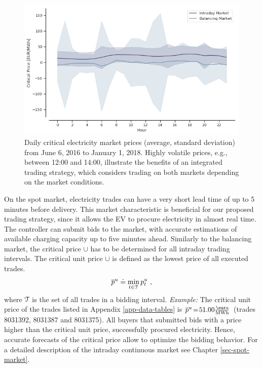 \documentclass[a4paper, 12pt]{article}
\begin{document}
\begin{figure}[hp]
\centering
\includegraphics[width=1\linewidth]{fig/critical-prices.png}
\caption[Critical electricity prices]{Daily critical electricity market prices (average, standard deviation) from June 6, 2016 to January 1, 2018. Highly volatile prices, e.g., between 12:00 and 14:00, illustrate the benefits of an integrated trading strategy, which considers trading on both markets depending on the market conditions.}
\end{figure}

On the spot market, electricity trades can have a very short lead time of up to
5 minutes before delivery. This market characteristic is beneficial for our
proposed trading strategy, since it allows the EV to procure electricity in
almost real time. The controller can submit bids to the market, with accurate
estimations of available charging capacity up to five minutes ahead. Similarly
to the balancing market, the critical price \(\cup{}\) has to be determined for
all intraday trading intervals. The critical unit price \(\cup{}\) is defined as
the lowest price of all executed trades.
\begin{equation*}
    \overline p^u_{} \doteq \min_{t \in \cal{T}} p^u_{t} \text{ ,}
\end{equation*}
where \(\cal{T}\) is the set of all trades in a bidding interval. \emph{Example:} The
critical unit price of the trades listed in Appendix \ref{app-data-tables} is
\(\cup{} \!=\!51.00 \emwh\) (trades 8031392, 8031387 and 8031375). All buyers that
submitted bids with a price higher than the critical unit price, successfully
procured electricity. Hence, accurate forecasts of the critical price allow to
optimize the bidding behavior. For a detailed description of the intraday
continuous market see Chapter \ref{sec-spot-market}.
\end{document}
